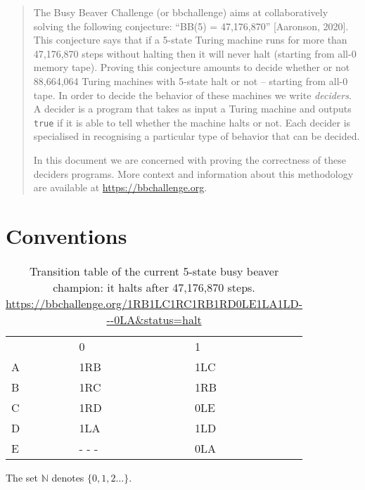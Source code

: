 \documentclass[a4paper,british]{article}
\theoremstyle{definition} %
\numberwithin{equation}{section}
\theoremstyle{definition} %
\begin{document}
\date{}
\maketitle

\begin{abstract}
  The Busy Beaver Challenge (or bbchallenge) aims at collaboratively solving the following conjecture: ``BB(5) = 47,176,870'' [Aaronson, 2020]\nocite{BusyBeaverFrontier}. This conjecture says that if a 5-state Turing machine runs for more than 47,176,870 steps without halting then it will never halt (starting from all-0 memory tape). Proving this conjecture amounts to decide whether or not 88,664,064 Turing machines with 5-state halt or not -- starting from all-0 tape. In order to decide the behavior of these machines we write \textit{deciders}. A decider is a program that takes as input a Turing machine and outputs \texttt{true} if it is able to tell whether the machine halts or not. Each decider is specialised in recognising a particular type of behavior that can be decided.

  In this document we are concerned with proving the correctness of these deciders programs. More context and information about this methodology are available at \url{https://bbchallenge.org}.
\end{abstract}
\tableofcontents

\section{Conventions}\label{sec:conventions}

\begin{table}[h!]
  \centering
  \begin{tabular}{lll}
      & 0     & 1   \\
    A & 1RB   & 1LC \\
    B & 1RC   & 1RB \\
    C & 1RD   & 0LE \\
    D & 1LA   & 1LD \\
    E & - - - & 0LA
  \end{tabular}
  \caption{Transition table of the current 5-state busy beaver champion: it halts after 47,176,870 steps.\\\url{https://bbchallenge.org/1RB1LC1RC1RB1RD0LE1LA1LD---0LA&status=halt}}
\end{table}\label{table:bb5}

The set $\mathbb{N}$ denotes $\{0,1,2\dots\}$.
\end{document}
